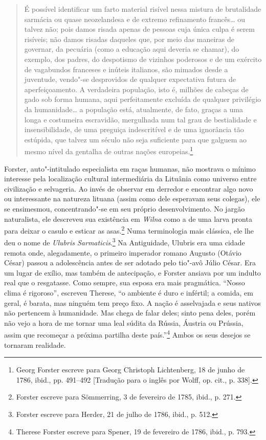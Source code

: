 \begin{quote}
É possível identificar um farto material risível nessa mistura de
brutalidade sarmácia ou quase neozelandesa e de extremo refinamento
francês\ldots{} ou talvez não; pois damos risada apenas de pessoas cuja
única culpa é serem risíveis; não damos risadas daqueles que, por meio
das maneiras de governar, da pecuária (como a educação aqui deveria se
chamar), do exemplo, dos padres, do despotismo de vizinhos poderosos e
de um exército de vagabundos franceses e inúteis italianos, são mimados
desde a juventude, vendo"-se desprovidos de qualquer expectativa futura
de aperfeiçoamento. A verdadeira população, isto é, milhões de cabeças
de gado sob forma humana, aqui perfeitamente excluída de qualquer
privilégio da humanidade\ldots{} a população está, atualmente, de fato,
graças a uma longa e costumeira escravidão, mergulhada num tal grau de
bestialidade e insensibilidade, de uma preguiça indescritível e de uma
ignorância tão estúpida, que talvez um século não seja suficiente para
que galguem ao mesmo nível da gentalha de outras nações
europeias.\footnote{Georg Forster escreve para Georg Christoph Lichtenberg, 18 de junho de 1786, ibid., pp. 491--492 [Tradução para o inglês por Wolff, op. cit., p. 338].}
\end{quote}

Forster, auto"-intitulado especialista em raças humanas, não mostrava o
mínimo interesse pela localização cultural intermediária da Lituânia
como universo entre civilização e selvageria. Ao invés de observar em
derredor e encontrar algo novo ou interessante na natureza lituana
(assim como dele esperavam seus colegas), ele se ensimesmou,
concentrando"-se em seu próprio desenvolvimento. No jargão naturalista,
ele descreveu sua existência em \textit{Wilna} como a de uma larva pronta para
deixar o casulo e esticar as asas.\footnote{Forster escreve para Sömmerring, 3 de fevereiro de 1785, ibid., p. 271.} Numa terminologia mais clássica, ele lhe deu o nome de \textit{Ulubris
Sarmaticis}.\footnote{Forster escreve para Herder, 21 de julho de 1786, ibid., p. 512.} Na Antiguidade, Ulubris era uma cidade remota onde, alegadamente, o primeiro imperador romano Augusto (Otávio César) passou
a adolescência antes de ser adotado pelo tio"-avô Júlio César. Era um
lugar de exílio, mas também de antecipação, e Forster ansiava por um
indulto real que o resgatasse. Como sempre, sua esposa era mais
pragmática. ``Nosso clima é rigoroso'', escreveu Therese, ``o ambiente é
duro e infértil; a comida, em geral, é barata, mas ninguém tem preço
fixo. A nação é asselvajada e seus nativos não pertencem à humanidade.
Mas chega de falar deles; sinto pena deles, porém não vejo a hora de me
tornar uma leal súdita da Rússia, Áustria ou Prússia, assim que
recomeçar a próxima partilha deste país.''\footnote{Therese Forster escreve para Spener, 19 de fevereiro de 1786, ibid., p. 793.} Ambos os seus desejos se tornaram realidade.

